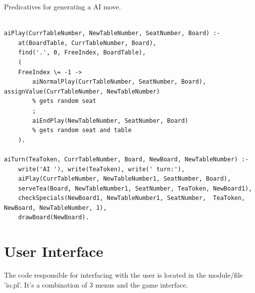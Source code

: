 \documentclass[a4paper]{article}
\begin{document}
\begin{listing}[H]
    \caption{Predicatives for generating a AI move.}
    \label{Codigo:cod_ai}
    \begin{verbatim}

aiPlay(CurrTableNumber, NewTableNumber, SeatNumber, Board) :-
    at(BoardTable, CurrTableNumber, Board),
    find('.', 0, FreeIndex, BoardTable),
    (
    FreeIndex \= -1 ->
        aiNormalPlay(CurrTableNumber, SeatNumber, Board), assignValue(CurrTableNumber, NewTableNumber)
        % gets random seat
        ;
        aiEndPlay(NewTableNumber, SeatNumber, Board)
        % gets random seat and table
    ).

aiTurn(TeaToken, CurrTableNumber, Board, NewBoard, NewTableNumber) :-
    write('AI '), write(TeaToken), write(' turn:'),
    aiPlay(CurrTableNumber, NewTableNumber1, SeatNumber, Board),
    serveTea(Board, NewTableNumber1, SeatNumber, TeaToken, NewBoard1),
    checkSpecials(NewBoard1, NewTableNumber1, SeatNumber,  TeaToken, NewBoard, NewTableNumber, 1),
    drawBoard(NewBoard).

\end{verbatim}

\end{listing}


\section{User Interface}

The code responsible for interfacing with the user is located in the module/file 'io.pl'.
It's a combination of 3 menus and the game interface.
\end{document}

